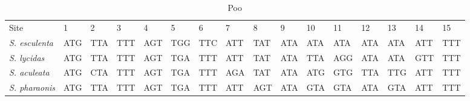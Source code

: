 \begin{table}[h!]
  \begin{tabular}{llllllllllllllll}
    Site                & 1   & 2   & 3   & 4   & 5   & 6   & 7   & 8   & 9   & 10  & 11  & 12  & 13  & 14  & 15  \\
    \emph{S. esculenta} & ATG & TTA & TTT & AGT & TGG & TTC & ATT & TAT & ATA & ATA & ATA & ATA & ATA & ATT & TTT \\
    \emph{S. lycidas}   & ATG & TTA & TTT & AGT & TGA & TTT & ATT & TAT & ATA & TTA & AGG & ATA & ATA & GTT & TTT \\
    \emph{S. aculeata}  & ATG & CTA & TTT & AGT & TGA & TTT & AGA & TAT & ATA & ATG & GTG & TTA & TTG & ATT & TTT \\
    \emph{S. pharaonis} & ATG & TTA & TTT & AGT & TGA & TTT & ATT & AGT & ATA & GTA & GTA & ATA & GTA & ATT & TTT \\
  \end{tabular}
  \caption{Poo}
  \label{tab:cuttlealign}
\end{table}
